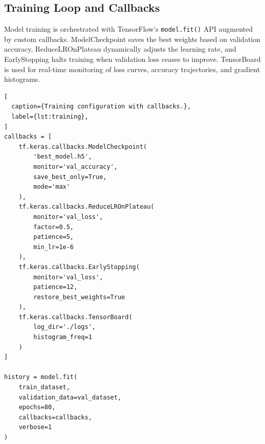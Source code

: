 \subsection{Training Loop and Callbacks}

Model training is orchestrated with TensorFlow's \texttt{model.fit()} API
augmented by custom callbacks. ModelCheckpoint saves the best weights based
on validation accuracy, ReduceLROnPlateau dynamically adjusts the learning
rate, and EarlyStopping halts training when validation loss ceases to
improve. TensorBoard is used for real-time monitoring of loss curves,
accuracy trajectories, and gradient histograms.

\begin{lstlisting}[
  caption={Training configuration with callbacks.},
  label={lst:training},
]
callbacks = [
    tf.keras.callbacks.ModelCheckpoint(
        'best_model.h5',
        monitor='val_accuracy',
        save_best_only=True,
        mode='max'
    ),
    tf.keras.callbacks.ReduceLROnPlateau(
        monitor='val_loss',
        factor=0.5,
        patience=5,
        min_lr=1e-6
    ),
    tf.keras.callbacks.EarlyStopping(
        monitor='val_loss',
        patience=12,
        restore_best_weights=True
    ),
    tf.keras.callbacks.TensorBoard(
        log_dir='./logs',
        histogram_freq=1
    )
]

history = model.fit(
    train_dataset,
    validation_data=val_dataset,
    epochs=80,
    callbacks=callbacks,
    verbose=1
)
\end{lstlisting}

